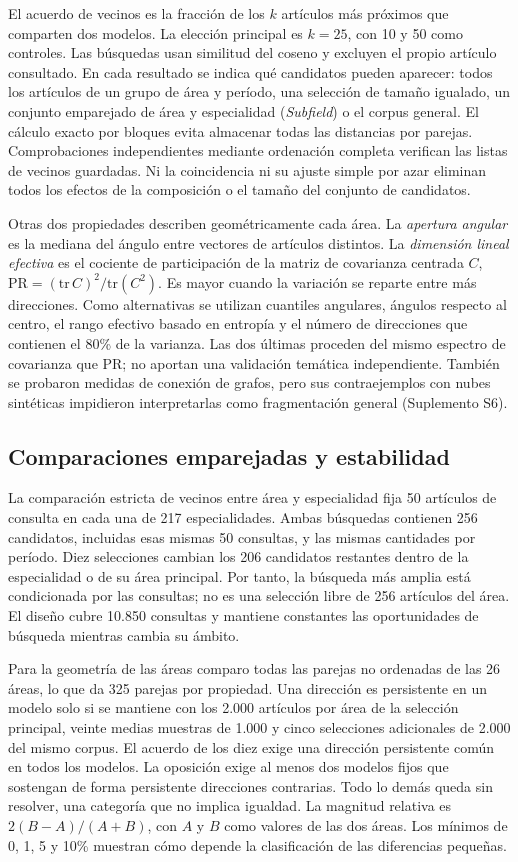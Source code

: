 \documentclass[12pt]{article}
\begin{document}
El acuerdo de vecinos es la fracción de los $k$ artículos más próximos que comparten dos modelos. La elección principal es $k=25$, con 10 y 50 como controles. Las búsquedas usan similitud del coseno y excluyen el propio artículo consultado. En cada resultado se indica qué candidatos pueden aparecer: todos los artículos de un grupo de área y período, una selección de tamaño igualado, un conjunto emparejado de área y especialidad (\emph{Subfield}) o el corpus general. El cálculo exacto por bloques evita almacenar todas las distancias por parejas. Comprobaciones independientes mediante ordenación completa verifican las listas de vecinos guardadas. Ni la coincidencia ni su ajuste simple por azar eliminan todos los efectos de la composición o el tamaño del conjunto de candidatos.

Otras dos propiedades describen geométricamente cada área. La \emph{apertura angular} es la mediana del ángulo entre vectores de artículos distintos. La \emph{dimensión lineal efectiva} es el cociente de participación de la matriz de covarianza centrada $C$, $\mathrm{PR}=(\mathrm{tr}\,C)^2/\mathrm{tr}(C^2)$. Es mayor cuando la variación se reparte entre más direcciones. Como alternativas se utilizan cuantiles angulares, ángulos respecto al centro, el rango efectivo basado en entropía y el número de direcciones que contienen el 80\% de la varianza. Las dos últimas proceden del mismo espectro de covarianza que PR; no aportan una validación temática independiente. También se probaron medidas de conexión de grafos, pero sus contraejemplos con nubes sintéticas impidieron interpretarlas como fragmentación general (Suplemento S6).

\subsection{Comparaciones emparejadas y estabilidad}
La comparación estricta de vecinos entre área y especialidad fija 50 artículos de consulta en cada una de 217 especialidades. Ambas búsquedas contienen 256 candidatos, incluidas esas mismas 50 consultas, y las mismas cantidades por período. Diez selecciones cambian los 206 candidatos restantes dentro de la especialidad o de su área principal. Por tanto, la búsqueda más amplia está condicionada por las consultas; no es una selección libre de 256 artículos del área. El diseño cubre 10.850 consultas y mantiene constantes las oportunidades de búsqueda mientras cambia su ámbito.

Para la geometría de las áreas comparo todas las parejas no ordenadas de las 26 áreas, lo que da 325 parejas por propiedad. Una dirección es persistente en un modelo solo si se mantiene con los 2.000 artículos por área de la selección principal, veinte medias muestras de 1.000 y cinco selecciones adicionales de 2.000 del mismo corpus. El acuerdo de los diez exige una dirección persistente común en todos los modelos. La oposición exige al menos dos modelos fijos que sostengan de forma persistente direcciones contrarias. Todo lo demás queda sin resolver, una categoría que no implica igualdad. La magnitud relativa es $2(B-A)/(A+B)$, con $A$ y $B$ como valores de las dos áreas. Los mínimos de 0, 1, 5 y 10\% muestran cómo depende la clasificación de las diferencias pequeñas.
\end{document}

